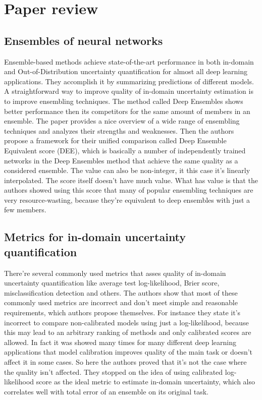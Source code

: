 \documentclass{article}
\begin{document}
\section{Paper review}
\subsection{Ensembles of neural networks}
    Ensemble-based methods achieve state-of-the-art performance in both in-domain and Out-of-Distribution uncertainty quantification for almost all deep learning applications. They accomplish it by summarizing predictions of different models. A straightforward way to improve quality of in-domain uncertainty estimation is to improve ensembling techniques. The method called Deep Ensembles \cite{ensembles} shows better performance then its competitors for the same amount of members in an ensemble. The paper \cite{pitfalls} provides a nice overview of a wide range of ensembling techniques and analyzes their strengths and weaknesses. Then the authors propose a framework for their unified comparison called Deep Ensemble Equivalent score (DEE), which is basically a number of independently trained networks in the Deep Ensembles method that achieve the same quality as a considered ensemble. The value can also be non-integer, it this case it's linearly interpolated. The score itself doesn't have much value. What has value is that the authors showed using this score that many of popular ensembling techniques are very resource-wasting, because they're equivalent to deep ensembles with just a few members.

\subsection{Metrics for in-domain uncertainty quantification}
    There're several commonly used metrics that asses quality of in-domain uncertainty quantification like average test log-likelihood, Brier score, misclassification detection and others. The authors show that most of these commonly used metrics are incorrect and don't meet simple and reasonable requirements, which authors propose themselves. For instance they state it's incorrect to compare non-calibrated models using just a log-likelihood, because this may lead to an arbitrary ranking of methods and only calibrated scores are allowed. In fact it was showed many times for many different deep learning applications that model calibration improves quality of the main task or doesn't affect it in some cases. So here the authors proved that it's not the case where the quality isn't affected. They stopped on the idea of using calibrated log-likelihood score as the ideal metric to estimate in-domain uncertainty, which also correlates well with total error of an ensemble on its original task.
\end{document}
